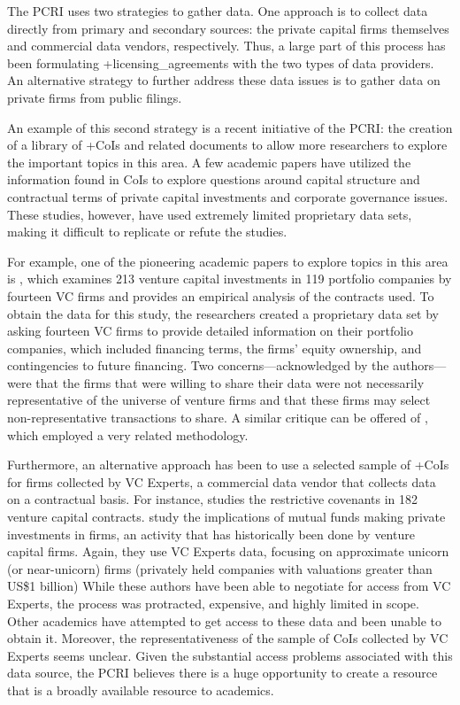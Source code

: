 \documentclass[
]{WileySix}
\begin{document}
The PCRI uses two strategies to gather data. One approach is to collect data directly from primary and secondary sources: the private capital firms themselves and commercial data vendors, respectively. Thus, a large part of this process has been formulating +licensing\_agreements\textbar{} with the two types of data providers. An alternative strategy to further address these data issues is to gather data on private firms from public filings.

An example of this second strategy is a recent initiative of the PCRI: the creation of a library of +CoIs\textbar{} and related documents to allow more researchers to explore the important topics in this area. A few academic papers have utilized the information found in CoIs to explore questions around capital structure and contractual terms of private capital investments and corporate governance issues. These studies, however, have used extremely limited proprietary data sets, making it difficult to replicate or refute the studies.

For example, one of the pioneering academic papers to explore topics in this area is \citet{kaplan2003}, which examines 213 venture capital investments in 119 portfolio companies by fourteen VC firms and provides an empirical analysis of the contracts used. To obtain the data for this study, the researchers created a proprietary data set by asking fourteen VC firms to provide detailed information on their portfolio companies, which included financing terms, the firms' equity ownership, and contingencies to future financing. Two concerns---acknowledged by the authors---were that the firms that were willing to share their data were not necessarily representative of the universe of venture firms and that these firms may select non-representative transactions to share. A similar critique can be offered of \citet{lerner2005}, which employed a very related methodology.

Furthermore, an alternative approach has been to use a selected sample of +CoIs\textbar{} for firms collected by VC Experts, a commercial data vendor that collects data on a contractual basis. For instance, \citet{bengtsson2011} studies the restrictive covenants in 182 venture capital contracts. \citet{chernenko2019} study the implications of mutual funds making private investments in firms, an activity that has historically been done by venture capital firms. Again, they use VC Experts data, focusing on approximate unicorn (or near-unicorn) firms (privately held companies with valuations greater than US\$1 billion) While these authors have been able to negotiate for access from VC Experts, the process was protracted, expensive, and highly limited in scope. Other academics have attempted to get access to these data and been unable to obtain it. Moreover, the representativeness of the sample of CoIs collected by VC Experts seems unclear. Given the substantial access problems associated with this data source, the PCRI believes there is a huge opportunity to create a resource that is a broadly available resource to academics.
\end{document}
